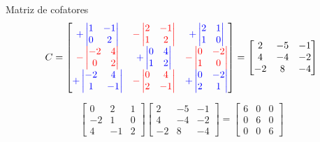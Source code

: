 \documentclass{beamer}
\begin{document}
\begin{frame}{Matriz de cofatores}
\begin{gather*}
  C=
\begin{bmatrix}
  \textcolor{blue}{ +
\begin{vmatrix}
1 & -1 \\ 0 & 2
\end{vmatrix}}&
\textcolor{red}{-\begin{vmatrix}
2 & -1 \\ 1 & 2
\end{vmatrix}}&
\textcolor{blue}{+\begin{vmatrix}
2 & 1 \\ 1 & 0
\end{vmatrix}} \\
\textcolor{red}{-\begin{vmatrix}
-2 & 4 \\ 0 & 2
\end{vmatrix}} & 
\textcolor{blue}{+\begin{vmatrix}
0 & 4 \\ 1 & 2
\end{vmatrix}} &
\textcolor{red}{-\begin{vmatrix}
0 & -2 \\ 1 & 0
\end{vmatrix}} \\
\textcolor{blue}{+\begin{vmatrix}
-2 & 4 \\ 1 & -1
\end{vmatrix}}&
\textcolor{red}{-\begin{vmatrix}
0 & 4 \\ 2 & {-1}
\end{vmatrix}}&
\textcolor{blue}{+\begin{vmatrix}
0 & -2 \\ 2 & 1
\end{vmatrix}}
\end{bmatrix}= \begin{bmatrix}
  2 & -5 & -1 \\ 4 & -4 & -2 \\ -2 & 8 & -4
\end{bmatrix}
\end{gather*}
\end{frame}

\begin{frame}
  $$
 \begin{bmatrix}
   0 & 2 & 1 \\ -2 & 1 & 0 \\ 4 & -1 & 2
 \end{bmatrix} 
  \begin{bmatrix}
    2 & -5 & -1 \\ 4 & -4 & -2 \\ -2 & 8 & -4
  \end{bmatrix}= \begin{bmatrix}
    6 & 0 & 0 \\ 0 & 6 & 0 \\ 0 & 0 & 6
  \end{bmatrix}
  $$
\end{frame}
\end{document}
